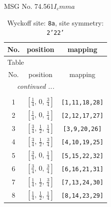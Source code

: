 \documentclass[fleqn,8pt]{jsarticle}
\begin{document}
\setcounter{MaxMatrixCols}{32}

\renewcommand{\tablename}{Table~}
\renewcommand{\figurename}{Figure~}
\begin{center}
\LARGE
MSG No. 74.561\quad$I_{c}mma$
\end{center}
\renewcommand{\arraystretch}{1.2}
\begin{longtable}{ccc}
\caption{Wyckoff site: {\tt 8a}, site symmetry: {\tt 2'22'}}
 \\
 \hline \hline
No. & position & mapping \\ \hline \endfirsthead

\multicolumn{2}{l}{\tablename\ \thetable{}} \\
 \hline \hline
No. & position & mapping \\ \hline \endhead

 \hline \hline
\multicolumn{2}{r}{\footnotesize\it continued ...} \\ \endfoot

 \hline \hline
\multicolumn{2}{r}{} \\ \endlastfoot

1 & $\left[ \frac{1}{4},\, 0,\, \frac{3}{4} \right]$ & {\tt [1,11,18,28]} \\ \hline
2 & $\left[ \frac{1}{4},\, 0,\, \frac{1}{4} \right]$ & {\tt [2,12,17,27]} \\ \hline
3 & $\left[ \frac{3}{4},\, \frac{1}{2},\, \frac{1}{4} \right]$ & {\tt [3,9,20,26]} \\ \hline
4 & $\left[ \frac{3}{4},\, \frac{1}{2},\, \frac{3}{4} \right]$ & {\tt [4,10,19,25]} \\ \hline
5 & $\left[ \frac{3}{4},\, 0,\, \frac{1}{4} \right]$ & {\tt [5,15,22,32]} \\ \hline
6 & $\left[ \frac{3}{4},\, 0,\, \frac{3}{4} \right]$ & {\tt [6,16,21,31]} \\ \hline
7 & $\left[ \frac{1}{4},\, \frac{1}{2},\, \frac{3}{4} \right]$ & {\tt [7,13,24,30]} \\ \hline
8 & $\left[ \frac{1}{4},\, \frac{1}{2},\, \frac{1}{4} \right]$ & {\tt [8,14,23,29]} \\
\end{longtable}
\renewcommand{\arraystretch}{1.2}
\end{document}
